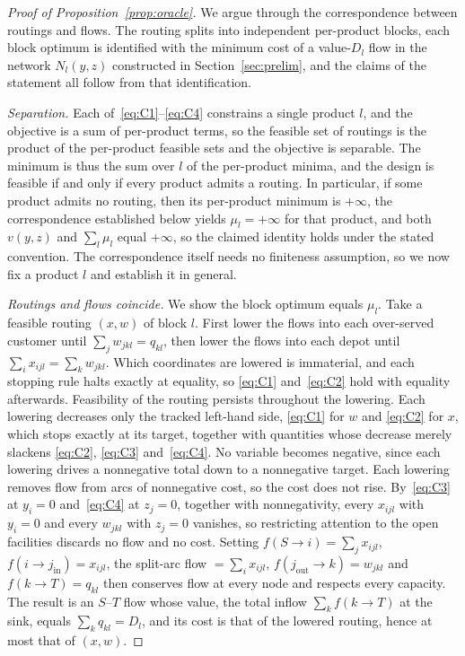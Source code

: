 \begin{proof}[Proof of Proposition~\ref{prop:oracle}]
We argue through the correspondence between routings and flows. The
routing splits into independent per-product blocks, each block optimum
is identified with the minimum cost of a value-$D_l$ flow in the network
$N_l(y,z)$ constructed in Section~\ref{sec:prelim}, and the claims of the statement all follow
from that identification.

\emph{Separation.} Each of~\eqref{eq:C1}--\eqref{eq:C4} constrains a
single product $l$, and the objective is a sum of per-product terms, so
the feasible set of routings is the product of the per-product feasible
sets and the objective is separable. The minimum is thus the sum over $l$
of the per-product minima, and the design is feasible if and only if every
product admits a routing. In particular, if some product admits no
routing, then its per-product minimum is $+\infty$, the correspondence
established below yields $\mu_l=+\infty$ for that product, and both
$v(y,z)$ and $\sum_l\mu_l$ equal $+\infty$, so the claimed identity holds
under the stated convention. The correspondence itself needs no
finiteness assumption, so we now fix a product $l$ and establish it in
general.

\emph{Routings and flows coincide.} We show the block optimum equals
$\mu_l$. Take a feasible routing $(x,w)$ of block $l$. First lower the
flows into each over-served customer until $\sum_j w_{jkl}=q_{kl}$, then
lower the flows into each depot until $\sum_i x_{ijl}=\sum_k w_{jkl}$.
Which coordinates are lowered is immaterial, and each stopping rule halts
exactly at equality, so \eqref{eq:C1} and~\eqref{eq:C2} hold with
equality afterwards. Feasibility of the routing persists throughout the
lowering. Each lowering decreases only the tracked left-hand side,
\eqref{eq:C1} for $w$ and \eqref{eq:C2} for $x$, which stops exactly at
its target, together with quantities whose decrease merely slackens
\eqref{eq:C2}, \eqref{eq:C3} and~\eqref{eq:C4}. No variable becomes negative, since each lowering drives a
nonnegative total down to a nonnegative target. Each lowering removes
flow from arcs of nonnegative cost, so the cost does not rise.
By~\eqref{eq:C3} at $y_i=0$ and~\eqref{eq:C4} at $z_j=0$, together with
nonnegativity, every $x_{ijl}$ with $y_i=0$ and every $w_{jkl}$ with
$z_j=0$ vanishes, so restricting attention to the open facilities
discards no flow and no cost. Setting $f(S\!\to\! i)=\sum_j x_{ijl}$,
$f(i\!\to\! j_{\mathrm{in}})=x_{ijl}$, the split-arc flow
$=\sum_i x_{ijl}$, $f(j_{\mathrm{out}}\!\to\! k)=w_{jkl}$ and
$f(k\!\to\! T)=q_{kl}$ then conserves flow at every node and respects
every capacity. The result is an $S$--$T$ flow whose value, the total
inflow $\sum_k f(k\!\to\! T)$ at the sink, equals $\sum_k q_{kl}=D_l$,
and its cost is that of the lowered routing, hence at most that of
$(x,w)$.


\end{proof}
